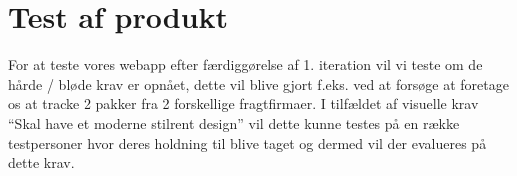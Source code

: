 \chapter{Test af produkt}
For at teste vores webapp efter færdiggørelse af 1. iteration vil vi teste om de 
hårde / bløde krav er opnået, dette vil blive gjort f.eks. ved at forsøge at foretage 
os at tracke 2 pakker fra 2 forskellige fragtfirmaer. I tilfældet af visuelle krav 
“Skal have et moderne stilrent design” vil dette kunne testes på en række testpersoner 
hvor deres holdning til blive taget og dermed vil der evalueres på dette krav.

